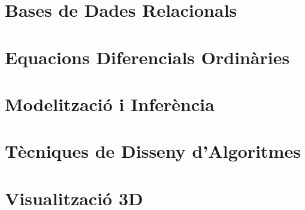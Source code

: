 \documentclass[a4paper,12pt]{article}
\author{EDUARDO PÉREZ MOTATO}
\begin{document}
    
    \tableofcontents
    \section{Bases de Dades Relacionals}
    
    \section{Equacions Diferencials Ordinàries}
    
    \section{Modelització i Inferència}
    
    \section{Tècniques de Disseny d'Algoritmes}
    
    \section{Visualització 3D}
    
\end{document}
